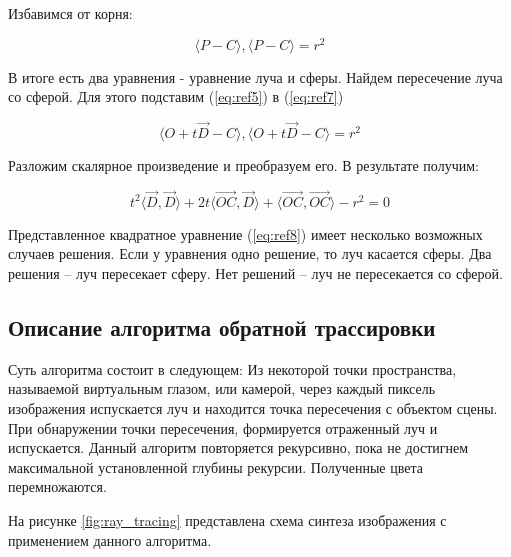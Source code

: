             Избавимся от корня:
            
            \begin{equation}
            	\langle P - C\rangle, \langle P - C\rangle = r^2
            	\label{eq:ref7}
            \end{equation}
            
            В итоге есть два уравнения - уравнение луча и сферы. Найдем пересечение луча со сферой. Для этого подставим (\ref{eq:ref5}) в (\ref{eq:ref7})
            
            \begin{equation}
            	\langle O + t\overrightarrow{D} - C \rangle, \langle O + t\overrightarrow{D} - C\rangle = r^2
            \end{equation}
            
            Разложим скалярное произведение и преобразуем его. В результате получим:
            
            \begin{equation}
            	t^2 \langle \overrightarrow{D}, \overrightarrow{D} \rangle + 2t \langle \overrightarrow{OC}, \overrightarrow{D} \rangle + \langle \overrightarrow{OC}, \overrightarrow{OC} \rangle -r^2 = 0
            	\label{eq:ref8}
            \end{equation}
            
            Представленное квадратное уравнение (\ref{eq:ref8}) имеет несколько возможных случаев решения. Если у уравнения одно решение, то луч касается сферы. Два решения -- луч пересекает сферу. Нет решений -- луч не пересекается со сферой.

        \subsection{Описание алгоритма обратной трассировки}
        
            Суть алгоритма состоит в следующем: Из некоторой точки пространства, называемой виртуальным глазом, или камерой, через каждый пиксель изображения испускается луч и находится точка пересечения с объектом сцены. При обнаружении точки пересечения, формируется отраженный луч и испускается. Данный алгоритм повторяется рекурсивно, пока не достигнем максимальной установленной глубины рекурсии. Полученные цвета перемножаются.

            На рисунке \ref{fig:ray_tracing} представлена схема синтеза изображения с применением данного алгоритма.

